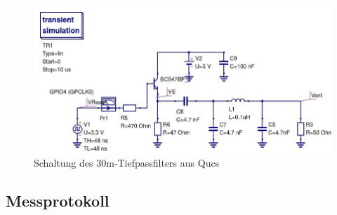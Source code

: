 \begin{figure}[H]
    \centering
    \includegraphics[width=1\textwidth]{Messtechnik/Bilder/30mRaspiAmpLP.jpg}
    \caption{Schaltung des 30m-Tiefpassfilters aus Qucs}
    \label{30mLP}
\end{figure}

\subsection*{Messprotokoll}

